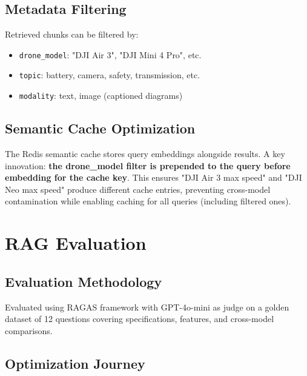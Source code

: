 \documentclass[12pt,a4paper]{article}
\begin{document}
\subsection{Metadata Filtering}

Retrieved chunks can be filtered by:
\begin{itemize}
  \item \texttt{drone\_model}: "DJI Air 3", "DJI Mini 4 Pro", etc.
  \item \texttt{topic}: battery, camera, safety, transmission, etc.
  \item \texttt{modality}: text, image (captioned diagrams)
\end{itemize}

\subsection{Semantic Cache Optimization}

The Redis semantic cache stores query embeddings alongside results. A key innovation: \textbf{the drone\_model filter is prepended to the query before embedding for the cache key}. This ensures "DJI Air 3 max speed" and "DJI Neo max speed" produce different cache entries, preventing cross-model contamination while enabling caching for all queries (including filtered ones).

\section{RAG Evaluation}
\label{sec:rag-eval}

\subsection{Evaluation Methodology}

Evaluated using RAGAS framework with GPT-4o-mini as judge on a golden dataset of 12 questions covering specifications, features, and cross-model comparisons.

\subsection{Optimization Journey}
\end{document}
